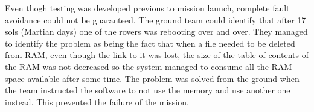 Even thogh testing was developed previous to mission launch, complete fault
avoidance could not be guaranteed. The ground team could identify that after 17
sols (Martian days) one of the rovers was rebooting over and over. They managed
to identify the problem as being the fact that when a file needed to be deleted
from RAM, even though the link to it was lost, the size of the table of contents
of the RAM was not decreased so the system managed to consume all the RAM space
available after some time. The problem was solved from the ground when the team
instructed the software to not use the memory and use another one instead. This
prevented the failure of the mission.
